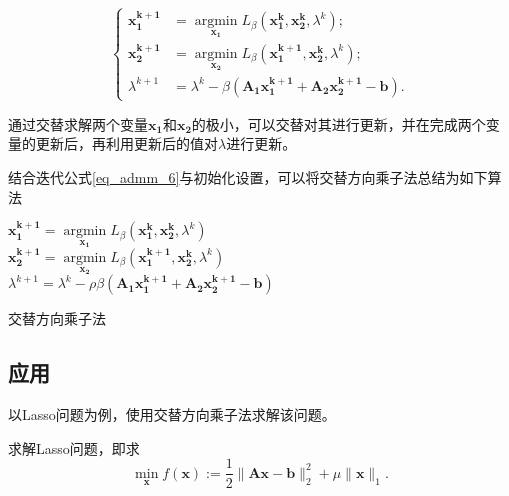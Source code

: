 \begin{equation}\label{eq_admm_6}
    \begin{cases}
        \bm{x_{1}^{k+1}} &= \mathop{\mathrm{argmin}}\limits_{\bm{x_{1}}} L_{\beta}(\bm{x_{1}^{k}, x_{2}^{k}}, \lambda^{k}) ; \\
        \bm{x_{2}^{k+1}} &= \mathop{\mathrm{argmin}}\limits_{\bm{x_{2}}} L_{\beta}(\bm{x_{1}^{k+1}, x_{2}^{k}}, \lambda^{k}) ; \\
        \lambda^{k+1} &= \lambda^{k} - \beta (\bm{A_{1}x_{1}^{k+1} + A_{2}x_{2}^{k+1} - b}).
    \end{cases}
\end{equation}

通过交替求解两个变量$\bm{x_{1}}$和$\bm{x_{2}}$的极小，可以交替对其进行更新，并在完成两个变量的更新后，再利用更新后的值对$\lambda$进行更新。

结合迭代公式\ref{eq_admm_6}与初始化设置，可以将交替方向乘子法\cite{2017ADMM}总结为如下算法

\begin{algorithm}\label{alg_admm_2}

    \SetAlgoLined

     {
        $\bm{x_{1}^{k+1}} = \mathop{\mathrm{argmin}}\limits_{\bm{x_{1}}} L_{\beta}(\bm{x_{1}^{k}, x_{2}^{k}}, \lambda^{k})$  \\        
        
        $\bm{x_{2}^{k+1}} = \mathop{\mathrm{argmin}}\limits_{\bm{x_{2}}} L_{\beta}(\bm{x_{1}^{k+1}, x_{2}^{k}}, \lambda^{k})$  \\

        $\lambda^{k+1} = \lambda^{k} - \rho \beta (\bm{A_{1}x_{1}^{k+1} + A_{2}x_{2}^{k+1} - b})$
    }
    \caption{交替方向乘子法}
\end{algorithm}

\subsection{应用}

以Lasso问题为例，使用交替方向乘子法求解该问题。

\begin{problem}
    求解Lasso问题，即求
    \begin{equation}
        \mathop{\mathrm{min}}\limits_{\bm{x}} f(\bm{x}) := \frac{1}{2}\|\bm{A} \bm{x}-\bm{b}\|_{2}^{2} + \mu\|\bm{x}\|_{1}.
    \end{equation}
\end{problem}

